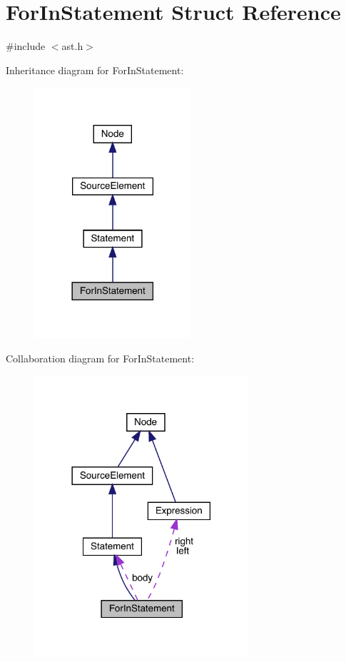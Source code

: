 \hypertarget{struct_for_in_statement}{}\section{For\+In\+Statement Struct Reference}
\label{struct_for_in_statement}


{\ttfamily \#include $<$ast.\+h$>$}



Inheritance diagram for For\+In\+Statement\+:\nopagebreak
\begin{figure}[H]
\begin{center}
\leavevmode
\includegraphics[width=165pt]{struct_for_in_statement__inherit__graph}
\end{center}
\end{figure}


Collaboration diagram for For\+In\+Statement\+:
\nopagebreak
\begin{figure}[H]
\begin{center}
\leavevmode
\includegraphics[width=225pt]{struct_for_in_statement__coll__graph}
\end{center}
\end{figure}
